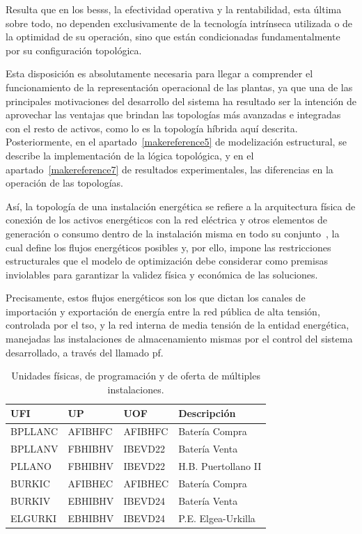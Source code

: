 Resulta que en los \glspl{bess}, la efectividad operativa y la rentabilidad, esta última sobre todo, no dependen exclusivamente de la tecnología intrínseca utilizada o de la optimidad de su operación, sino que están condicionadas fundamentalmente por su configuración topológica.

Esta disposición es absolutamente necesaria para llegar a comprender el funcionamiento de la representación operacional de las plantas, ya que una de las principales motivaciones del desarrollo del sistema ha resultado ser la intención de aprovechar las ventajas que brindan las topologías más avanzadas e integradas con el resto de activos, como lo es la topología híbrida aquí descrita. Posteriormente, en el apartado~\ref{makereference5} de modelización estructural, se describe la implementación de la lógica topológica, y en el apartado~\ref{makereference7} de resultados experimentales, las diferencias en la operación de las topologías.

Así, la topología de una instalación energética se refiere a la arquitectura física de conexión de los activos energéticos con la red eléctrica y otros elementos de generación o consumo dentro de la instalación misma en todo su conjunto~\cite{parlikar2019topology}, la cual define los flujos energéticos posibles y, por ello, impone las restricciones estructurales que el modelo de optimización debe considerar como premisas inviolables para garantizar la validez física y económica de las soluciones.

Precisamente, estos flujos energéticos son los que dictan los canales de importación y exportación de energía entre la red pública de alta tensión, controlada por el \gls{tso}, y la red interna de media tensión de la entidad energética, manejadas las instalaciones de almacenamiento mismas por el control del sistema desarrollado, a través del llamado \gls{pf}.

\begin{table}[ht]
  \centering
  \begin{tabular}{|l|l|l|l|}
    \hline
    UFI     & UP      & UOF     & Descripción         \\
    \hline
    BPLLANC & AFIBHFC & AFIBHFC & Batería Compra      \\
    BPLLANV & FBHIBHV & IBEVD22 & Batería Venta       \\
    PLLANO  & FBHIBHV & IBEVD22 & H.B. Puertollano II \\
    BURKIC  & AFIBHEC & AFIBHEC & Batería Compra      \\
    BURKIV  & EBHIBHV & IBEVD24 & Batería Venta       \\
    ELGURKI & EBHIBHV & IBEVD24 & P.E. Elgea-Urkilla  \\
    \hline
  \end{tabular}
  \caption[Unidades físicas, de programación y de oferta.]{Unidades físicas, de programación y de oferta de múltiples instalaciones.}%
  \label{tab:unidades-fisicas}
\end{table}

